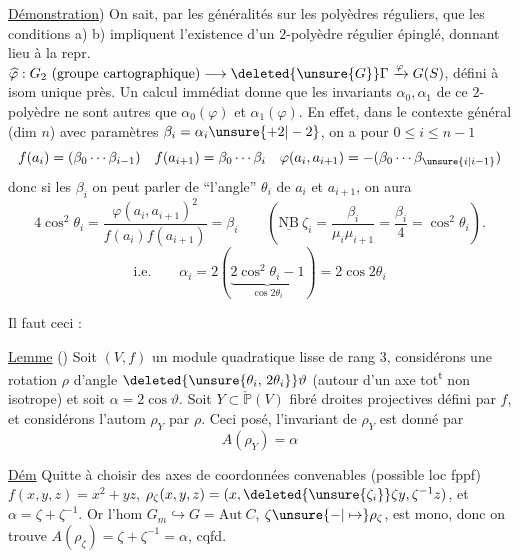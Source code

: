 \uline{Démonstration}) On sait, par les généralités sur les
polyèdres réguliers, que les conditions a) b) impliquent
l'existence d'un $2$-polyèdre régulier  épinglé, donnant lieu à
la repr. $\widehat\varphi:G_2\ (\text{groupe cartographique})\longrightarrow\deleted{\unsure{G}}\Gamma\xrightarrow{\varphi}G(S)$, 
défini à isom unique près. Un calcul immédiat
donne que les invariants $\alpha_0,\alpha_1$ de ce $2$-polyèdre ne sont
autres que $\alpha_0(\varphi)$ et $\alpha_1(\varphi)$. En effet, dans le contexte général
(dim $n$) avec paramètres $\beta_i=\alpha_i\unsure{+2|-2}$, on a pour $0\leq i\leq n-1$
\[ f(a_i)=(\beta_0\cdots\beta_{i-1})\quad f(a_{i+1})=\beta_0\cdots\beta_i\quad \varphi(a_i,a_{i+1})=-(\beta_0\cdots\beta_{\unsure{i|i-1}}) \]
donc si les $\beta_i$   on peut  parler de ``l'angle'' $\theta_i$
de $a_i$ et $a_{i+1}$, on aura
\[4\cos^2\theta_i=\frac{\varphi(a_i,a_{i+1})^2}{f(a_i)f(a_{i+1})}=\beta_i\qquad(\underline{\mathrm{NB}}\ \zeta_i=\frac{\beta_i}{\mu_i\mu_{i+1}}=\frac{\beta_i}{4}=\cos^2\theta_i).\]
\[\text{i.e.}\qquad\alpha_i=2(\underbrace{2\cos^2\theta_i-1}_{\cos2\theta_i})=2\cos2\theta_i\]

Il faut  ceci :

\uline{Lemme} () Soit $(V,f)$ un module quadratique
lisse de rang $3$, considérons une rotation  $\rho$
d'angle $\deleted{\unsure{\theta_i,\,2\theta_i}}\vartheta$ (autour d'un axe tot\textsuperscript{t} non isotrope)
et soit $\alpha=2\cos\vartheta$.  Soit  $Y\subset\check{\mathbb P}(V)$ fibré
 droites projectives défini par $f$, et considérons
l'autom $\rho_Y$  par $\rho$. Ceci posé, l'invariant
de $\rho_Y$ est donné par
\[ A(\rho_Y)=\alpha \]

\uline{Dém} Quitte à choisir des axes de coordonnées convenables
(possible loc fppf)  $f(x,y,z)=x^2+yz$,
$\rho_{\zeta}(x,y,z)=(x,\deleted{\unsure{\zeta_i}}\zeta y,\zeta^{-1}z)$, et $\alpha=\zeta+\zeta^{-1}$. Or l'hom
$G_m\hookrightarrow G=\mathrm{Aut}\ C$, $\zeta\unsure{\mathbin{-}|\mapsto}\rho_{\zeta}$, est mono, donc on
trouve $A(\rho_\zeta)=\zeta+\zeta^{-1}=\alpha$, cqfd.
